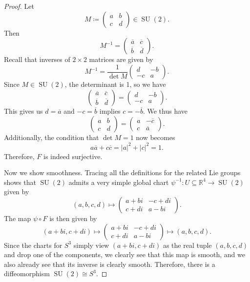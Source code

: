 \documentclass[11pt, letterpaper]{article}
\theoremstyle{plain}
\begin{document}
\begin{proof}
	Let
	\[
		M\coloneqq \begin{pmatrix}
		a & b \\
		c & d
		\end{pmatrix}\in \operatorname{SU} (2)
	.\]
	Then
	\[
		M^{-1} = \begin{pmatrix}
		\overline{a}  & \overline{c}  \\
		\overline{b}  & \overline{d} 
		\end{pmatrix}
	.\]
	Recall that inverses of $2\times 2$ matrices are given by
	\[
		M^{-1} =\frac{1}{\det M} \begin{pmatrix}
		d & -b \\
		-c & a
		\end{pmatrix}
	.\]
	Since $M\in \operatorname{SU} (2)$, the determinant is 1, so we have
	\[
		\begin{pmatrix}
		\overline{a}  & \overline{c}  \\
		\overline{b}  & \overline{d} 
		\end{pmatrix}=\begin{pmatrix}
		d & -b \\
		-c & a
		\end{pmatrix}
	.\]
	This gives us $d= \overline{a} $ and $-c= \overline{b}$ implies $c=- \overline{b} $. We thus have
	\[
		\begin{pmatrix}
		a & b \\
		c & d
		\end{pmatrix}=\begin{pmatrix}
		a & - \overline{c}  \\
		c & \overline{a} 
		\end{pmatrix}
	.\]
	Additionally, the condition that $\det M=1$ now becomes
	\[
		a \overline{a} + c \overline{c} =\left| a \right| ^2+\left| c \right| ^2=1
	.\]
	Therefore, $F$ is indeed surjective.

	Now we show smoothness. Tracing all the definitions for the related Lie groups shows that $\operatorname{SU} (2)$ admits a very simple global chart $\psi^{-1} : U\subseteq \mathbb{R} ^4\to \operatorname{SU} (2)$ given by
	\[
		(a,b,c,d)\mapsto \begin{pmatrix}
		a+bi & -c+di \\
		c+di & a-bi
		\end{pmatrix}
	.\]
	The map $\psi \circ F$ is then given by
	\[
		(a+bi,c+di)\mapsto \begin{pmatrix}
		a+bi & -c+di \\
		c+di & a-bi
		\end{pmatrix}\mapsto (a,b,c,d)
	.\]
	Since the charts for $S^3$ simply view $(a+bi,c+di)$ as the real tuple $(a,b,c,d)$ and drop one of the components, we clearly see that this map is smooth, and we also already see that its inverse is clearly smooth. Therefore, there is a diffeomorphism $\operatorname{SU} (2) \cong S^3$.
\end{proof}
\end{document}
